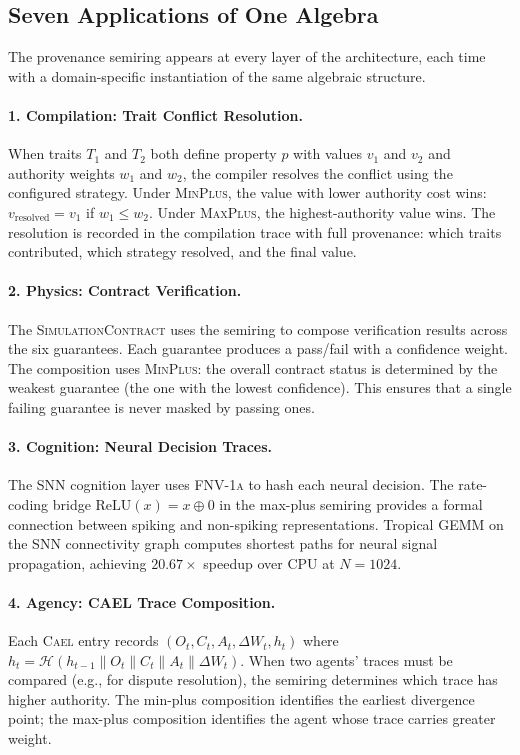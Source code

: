 \documentclass[sigchi-a]{acmart}
\newcommand{\cael}{\textsc{Cael}}
\newcommand{\fnvhash}{\textsc{FNV-1a}}
\newcommand{\simcontract}{\textsc{SimulationContract}}
\newcommand{\tropplus}{\oplus}
\newcommand{\hashfn}{\mathcal{H}}
\begin{document}
\subsection{Seven Applications of One Algebra}

The provenance semiring appears at every layer of the architecture, each time
with a domain-specific instantiation of the same algebraic structure.

\paragraph{1. Compilation: Trait Conflict Resolution.}
When traits $T_1$ and $T_2$ both define property $p$ with values $v_1$ and
$v_2$ and authority weights $w_1$ and $w_2$, the compiler resolves the
conflict using the configured strategy. Under \textsc{MinPlus}, the value
with lower authority cost wins: $v_{\text{resolved}} = v_1$ if
$w_1 \leq w_2$. Under \textsc{MaxPlus}, the highest-authority value wins.
The resolution is recorded in the compilation trace with full provenance:
which traits contributed, which strategy resolved, and the final value.

\paragraph{2. Physics: Contract Verification.}
The \simcontract{} uses the semiring to compose verification results across
the six guarantees. Each guarantee produces a pass/fail with a confidence
weight. The composition uses \textsc{MinPlus}: the overall contract status
is determined by the weakest guarantee (the one with the lowest confidence).
This ensures that a single failing guarantee is never masked by passing ones.

\paragraph{3. Cognition: Neural Decision Traces.}
The SNN cognition layer uses \fnvhash{} to hash each neural decision.
The rate-coding bridge $\text{ReLU}(x) = x \tropplus 0$ in the max-plus
semiring provides a formal connection between spiking and non-spiking
representations. Tropical GEMM on the SNN connectivity graph computes
shortest paths for neural signal propagation, achieving $20.67\times$
speedup over CPU at $N{=}1024$.

\paragraph{4. Agency: CAEL Trace Composition.}
Each \cael{} entry records $(O_t, C_t, A_t, \Delta W_t, h_t)$ where $h_t =
\hashfn(h_{t-1} \| O_t \| C_t \| A_t \| \Delta W_t)$. When two agents'
traces must be compared (e.g., for dispute resolution), the semiring
determines which trace has higher authority. The min-plus composition
identifies the earliest divergence point; the max-plus composition identifies
the agent whose trace carries greater weight.
\end{document}
